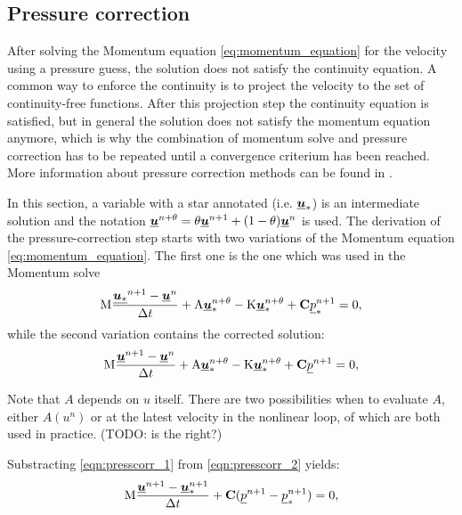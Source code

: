 \subsection{Pressure correction}

After solving the Momentum equation \eqref{eq:momentum_equation} for the velocity using a pressure guess, the solution does not satisfy the continuity equation. A common way to enforce the continuity is to project the velocity to the set of continuity-free functions. After this projection step the continuity equation is satisfied, but in general the solution does not satisfy the momentum equation anymore, which is why the combination of momentum solve and pressure correction has to be repeated until a convergence criterium has been reached. 
More information about pressure correction methods can be found in \cite{gresho1988}.

In this section, a variable with a star annotated (i.e. $\underline{{\mbox{\boldmath$u$}}}_*$) is an intermediate solution and the notation $\underline{{\mbox{\boldmath$u$}}}^{n+\theta}=\theta \underline{{\mbox{\boldmath$u$}}}^{n+1} + (1-\theta) \underline{{\mbox{\boldmath$u$}}}^{n}$ is used.
The derivation of the pressure-correction step starts with two variations of the Momentum equation \eqref{eq:momentum_equation}. The first one is the one which was used in the Momentum solve
\begin{equation}\label{eqn:presscorr_1}
\mathrm{M}  \frac{{\underline{{\mbox{\boldmath$u$}}_*}^{n+1}-\underline{{\mbox{\boldmath$u$}}}^{n}}}{\Delta t}
    +\mathrm{A}\underline{{\mbox{\boldmath$u$}}}_*^{n+\theta}-\mathrm{K}\underline{{\mbox{\boldmath$u$}}}_*^{n+\theta}
    +{\mbox{\boldmath$\mathrm{C}$}} \underline{p}_*^{n+1}
    =0,
\end{equation}
while the second variation contains the corrected solution:
\begin{equation}\label{eqn:presscorr_2}
\mathrm{M}  \frac{{\underline{{\mbox{\boldmath$u$}}}^{n+1}-\underline{{\mbox{\boldmath$u$}}}^{n}}}{\Delta t}
    +\mathrm{A}\underline{{\mbox{\boldmath$u$}}}_*^{n+\theta}-\mathrm{K}\underline{{\mbox{\boldmath$u$}}}_*^{n+\theta}
    +{\mbox{\boldmath$\mathrm{C}$}} \underline{p}^{n+1}
    =0,
\end{equation}

Note that $A$ depends on $u$ itself. There are two possibilities when to evaluate $A$, either $A(u^n)$ or at the latest velocity in the nonlinear loop, of which are both used in practice. (TODO: is the right?) 

Substracting \eqref{eqn:presscorr_1} from \eqref{eqn:presscorr_2} yields:
\begin{equation}\label{eqn:presscorr_substract}
\mathrm{M}  \frac{{\underline{{\mbox{\boldmath$u$}}}^{n+1}-\underline{{\mbox{\boldmath$u$}}}_*^{n+1}}}{\Delta t}
    + {\mbox{\boldmath$\mathrm{C}$}} ( \underline{p}^{n+1} - \underline{p}_*^{n+1})
    =0,
\end{equation}

